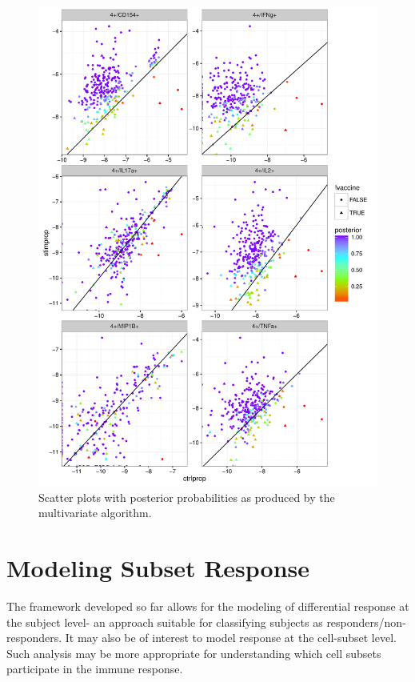 \documentclass{article}\usepackage[]{graphicx}\usepackage[]{color}
\makeatletter
\def\maxwidth{ %
  \ifdim\Gin@nat@width>\linewidth
    \linewidth
  \else
    \Gin@nat@width
  \fi
}
\makeatother
\begin{document}
\begin{figure}
\includegraphics[width=\maxwidth]{figures/multivariatescatter} \caption[]{Scatter plots with posterior probabilities as produced by the multivariate algorithm.}
\label{IL4}
\end{figure}







\section{Modeling Subset Response}
The framework developed so far allows for the modeling of differential response at the subject level- an approach suitable for classifying subjects as responders/non-responders. It may also be of interest to model response at the cell-subset level. Such analysis may be more appropriate for understanding which cell subsets participate in the immune response. 
\end{document}
